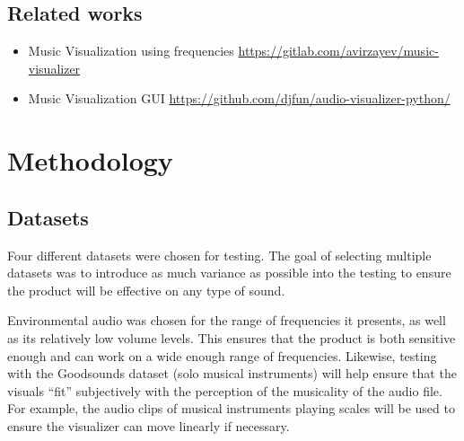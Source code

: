 \documentclass{article}
\begin{document}
\subsection{Related works}

\begin{itemize}
    \item Music Visualization using frequencies \url{https://gitlab.com/avirzayev/music-visualizer}
    \item Music Visualization GUI \url{https://github.com/djfun/audio-visualizer-python/}
    
\end{itemize}




\iffalse 
TODO:
    
\fi

\break

\section{Methodology}


\subsection{Datasets}

Four different datasets were chosen for testing. The goal of selecting multiple datasets was to introduce as much variance as possible into the testing to ensure the product will be effective on any type of sound. \newline

Environmental audio was chosen for the range of frequencies it presents, as well as its relatively low volume levels. This ensures that the product is both sensitive enough and can work on a wide enough range of frequencies. Likewise, testing with the Goodsounds dataset (solo musical instruments) will help ensure that the visuals “fit” subjectively with the perception of the musicality of the audio file. For example, the audio clips of musical instruments playing scales will be used to ensure the visualizer can move linearly if necessary. \newline
\end{document}
